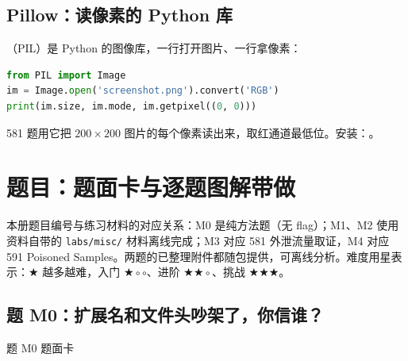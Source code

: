\documentclass[UTF8,12pt,oneside]{ctexbook}
\begin{document}
\section{Pillow：读像素的 Python 库}
（PIL）是 Python 的图像库，一行打开图片、一行拿像素：
\begin{lstlisting}[language=Python]
from PIL import Image
im = Image.open('screenshot.png').convert('RGB')
print(im.size, im.mode, im.getpixel((0, 0)))
\end{lstlisting}
581 题用它把 $200\times200$ 图片的每个像素读出来，取红通道最低位。安装：。

\chapter{题目：题面卡与逐题图解带做}
\label{chap:cards}

本册题目编号与练习材料的对应关系：M0 是纯方法题（无 flag）；M1、M2 使用资料自带的 \verb|labs/misc/| 材料离线完成；M3 对应 581 外泄流量取证，M4 对应 591 Poisoned Samples。两题的已整理附件都随包提供，可离线分析。难度用星表示：$\bigstar$ 越多越难，入门 $\bigstar\circ\circ$、进阶 $\bigstar\bigstar\circ$、挑战 $\bigstar\bigstar\bigstar$。

\section{题 M0：扩展名和文件头吵架了，你信谁？}

\begin{challenge}{题 M0 题面卡}
\end{challenge}
\end{document}
